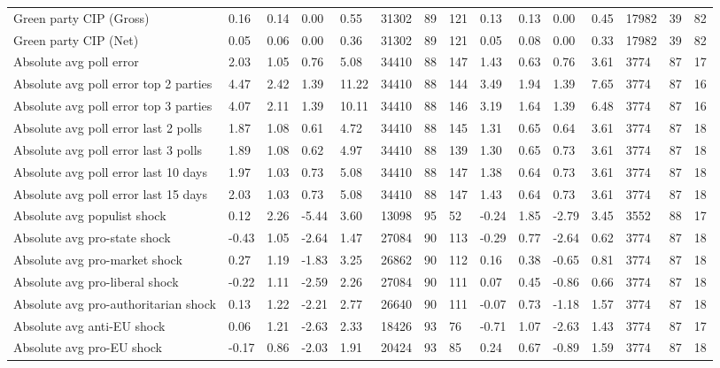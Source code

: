 \begin{longtable}{lllllllllllllll}
\addlinespace
Green party CIP (Gross) & 0.16 & 0.14 & 0.00 & 0.55 & 31302 & 89 & 121 & 0.13 & 0.13 & 0.00 & 0.45 & 17982 & 39 & 82\\
Green party CIP (Net) & 0.05 & 0.06 & 0.00 & 0.36 & 31302 & 89 & 121 & 0.05 & 0.08 & 0.00 & 0.33 & 17982 & 39 & 82\\
Absolute avg poll error & 2.03 & 1.05 & 0.76 & 5.08 & 34410 & 88 & 147 & 1.43 & 0.63 & 0.76 & 3.61 & 3774 & 87 & 17\\
Absolute avg poll error top 2 parties & 4.47 & 2.42 & 1.39 & 11.22 & 34410 & 88 & 144 & 3.49 & 1.94 & 1.39 & 7.65 & 3774 & 87 & 16\\
Absolute avg poll error top 3 parties & 4.07 & 2.11 & 1.39 & 10.11 & 34410 & 88 & 146 & 3.19 & 1.64 & 1.39 & 6.48 & 3774 & 87 & 16\\
\addlinespace
Absolute avg poll error last 2 polls & 1.87 & 1.08 & 0.61 & 4.72 & 34410 & 88 & 145 & 1.31 & 0.65 & 0.64 & 3.61 & 3774 & 87 & 18\\
Absolute avg poll error last 3 polls & 1.89 & 1.08 & 0.62 & 4.97 & 34410 & 88 & 139 & 1.30 & 0.65 & 0.73 & 3.61 & 3774 & 87 & 18\\
Absolute avg poll error last 10 days & 1.97 & 1.03 & 0.73 & 5.08 & 34410 & 88 & 147 & 1.38 & 0.64 & 0.73 & 3.61 & 3774 & 87 & 18\\
Absolute avg poll error last 15 days & 2.03 & 1.03 & 0.73 & 5.08 & 34410 & 88 & 147 & 1.43 & 0.64 & 0.73 & 3.61 & 3774 & 87 & 18\\
Absolute avg populist shock & 0.12 & 2.26 & -5.44 & 3.60 & 13098 & 95 & 52 & -0.24 & 1.85 & -2.79 & 3.45 & 3552 & 88 & 17\\
\addlinespace
Absolute avg pro-state shock & -0.43 & 1.05 & -2.64 & 1.47 & 27084 & 90 & 113 & -0.29 & 0.77 & -2.64 & 0.62 & 3774 & 87 & 18\\
Absolute avg pro-market shock & 0.27 & 1.19 & -1.83 & 3.25 & 26862 & 90 & 112 & 0.16 & 0.38 & -0.65 & 0.81 & 3774 & 87 & 18\\
Absolute avg pro-liberal shock & -0.22 & 1.11 & -2.59 & 2.26 & 27084 & 90 & 111 & 0.07 & 0.45 & -0.86 & 0.66 & 3774 & 87 & 18\\
Absolute avg pro-authoritarian shock & 0.13 & 1.22 & -2.21 & 2.77 & 26640 & 90 & 111 & -0.07 & 0.73 & -1.18 & 1.57 & 3774 & 87 & 18\\
Absolute avg anti-EU shock & 0.06 & 1.21 & -2.63 & 2.33 & 18426 & 93 & 76 & -0.71 & 1.07 & -2.63 & 1.43 & 3774 & 87 & 17\\
\addlinespace
Absolute avg pro-EU shock & -0.17 & 0.86 & -2.03 & 1.91 & 20424 & 93 & 85 & 0.24 & 0.67 & -0.89 & 1.59 & 3774 & 87 & 18\\

\end{longtable}
